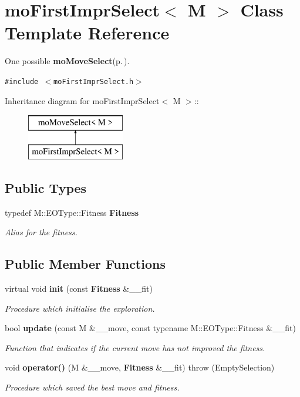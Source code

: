 \section{mo\-First\-Impr\-Select$<$ M $>$ Class Template Reference}
\label{classmo_first_impr_select}
One possible {\bf mo\-Move\-Select}{\rm (p.\,\pageref{classmo_move_select})}.  


{\tt \#include $<$mo\-First\-Impr\-Select.h$>$}

Inheritance diagram for mo\-First\-Impr\-Select$<$ M $>$::\begin{figure}[H]
\begin{center}
\leavevmode
\includegraphics[height=2cm]{classmo_first_impr_select}
\end{center}
\end{figure}
\subsection*{Public Types}
\begin{CompactItemize}
\item 
typedef M::EOType::Fitness {\bf Fitness}\label{classmo_first_impr_select_64763ce3e6d2873266624382b407fa5a}

\begin{CompactList}\small\item\em Alias for the fitness. \item\end{CompactList}\end{CompactItemize}
\subsection*{Public Member Functions}
\begin{CompactItemize}
\item 
virtual void {\bf init} (const {\bf Fitness} \&\_\-\_\-fit)
\begin{CompactList}\small\item\em Procedure which initialise the exploration. \item\end{CompactList}\item 
bool {\bf update} (const M \&\_\-\_\-move, const typename M::EOType::Fitness \&\_\-\_\-fit)
\begin{CompactList}\small\item\em Function that indicates if the current move has not improved the fitness. \item\end{CompactList}\item 
void {\bf operator()} (M \&\_\-\_\-move, {\bf Fitness} \&\_\-\_\-fit)  throw (Empty\-Selection)
\begin{CompactList}\small\item\em Procedure which saved the best move and fitness. \item\end{CompactList}\end{CompactItemize}

